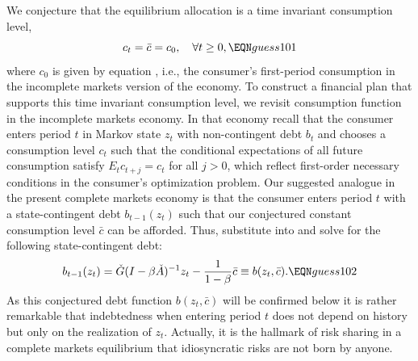 We conjecture that the equilibrium allocation is a time
invariant consumption level, 
$$ c_t = \bar c  = c_0 , \quad \forall t \geq 0, \EQN guess101 $$
where  $c_0$ is given by equation , i.e.,
the consumer's first-period consumption in the 
incomplete markets version of the economy.
To construct a financial plan that supports this
time invariant consumption level, we revisit consumption
function  in the 
incomplete markets economy. In that economy recall that
the consumer enters period $t$ in Markov state $z_t$
with non-contingent debt $b_t$ and chooses a 
consumption level $c_t$ such that the conditional 
expectations of all future consumption satisfy 
$E_t c_{t+j} = c_t$ for all $j>0$, which reflect
first-order necessary conditions in the consumer's
optimization problem. Our suggested analogue
in the present complete markets 
economy is that the consumer enters period $t$
with a state-contingent debt $b_{t-1}(z_t)$ such
that our conjectured constant 
consumption level $\bar c$ can be afforded. Thus, 
substitute  into 
 and
solve for the following state-contingent debt:
$$ b_{t-1}(z_{t}) =  \check G(I-\beta \check A)^{-1} z_{t} 
- {\frac{1}{1-\beta}} \bar c \equiv b(z_{t}, \bar c) . 
                                           \EQN guess102 $$
As this conjectured debt function $b(z_{t}, \bar c)$ 
will be confirmed below it is rather
remarkable that indebtedness when entering
period $t$ does not depend on history but only on 
the realization of $z_{t}$.%
Actually, it is the hallmark of risk sharing in 
a complete markets equilibrium that idiosyncratic risks
are not born by anyone.

